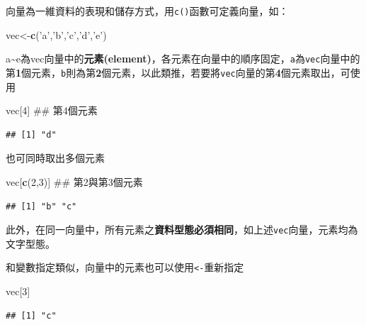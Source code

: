 \documentclass[]{book}
\newenvironment{Shaded}{\begin{snugshade}}{\end{snugshade}}
\newcommand{\KeywordTok}[1]{\textcolor[rgb]{0.13,0.29,0.53}{\textbf{{#1}}}}
\newcommand{\DecValTok}[1]{\textcolor[rgb]{0.00,0.00,0.81}{{#1}}}
\newcommand{\StringTok}[1]{\textcolor[rgb]{0.31,0.60,0.02}{{#1}}}
\newcommand{\NormalTok}[1]{{#1}}
\theoremstyle{definition}
\theoremstyle{definition}
\theoremstyle{remark}
\begin{document}
向量為一維資料的表現和儲存方式，用\texttt{c()}函數可定義向量，如：

\begin{Shaded}
\begin{Highlighting}[]
\NormalTok{vec<-}\KeywordTok{c}\NormalTok{(}\StringTok{'a'}\NormalTok{,}\StringTok{'b'}\NormalTok{,}\StringTok{'c'}\NormalTok{,}\StringTok{'d'}\NormalTok{,}\StringTok{'e'}\NormalTok{)}
\end{Highlighting}
\end{Shaded}

a\textasciitilde{}e為vec向量中的\textbf{元素(element)}，各元素在向量中的順序固定，\texttt{a}為\texttt{vec}向量中的第\textbf{1}個元素，\texttt{b}則為第\textbf{2}個元素，以此類推，若要將\texttt{vec}向量的第\textbf{4}個元素取出，可使用

\begin{Shaded}
\begin{Highlighting}[]
\NormalTok{vec[}\DecValTok{4}\NormalTok{] ## 第4個元素}
\end{Highlighting}
\end{Shaded}

\begin{verbatim}
## [1] "d"
\end{verbatim}

也可同時取出多個元素

\begin{Shaded}
\begin{Highlighting}[]
\NormalTok{vec[}\KeywordTok{c}\NormalTok{(}\DecValTok{2}\NormalTok{,}\DecValTok{3}\NormalTok{)] ## 第2與第3個元素}
\end{Highlighting}
\end{Shaded}

\begin{verbatim}
## [1] "b" "c"
\end{verbatim}

此外，在同一向量中，所有元素之\textbf{資料型態必須相同}，如上述\texttt{vec}向量，元素均為文字型態。

和變數指定類似，向量中的元素也可以使用\texttt{\textless{}-}重新指定

\begin{Shaded}
\begin{Highlighting}[]
\NormalTok{vec[}\DecValTok{3}\NormalTok{]}
\end{Highlighting}
\end{Shaded}

\begin{verbatim}
## [1] "c"
\end{verbatim}
\end{document}
